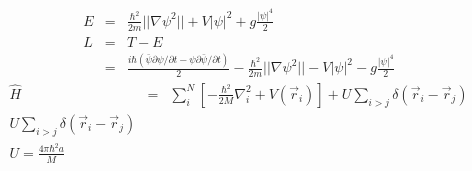 \documentclass[12pt,a4paper]{report} %
\begin{document}
\begin{eqnarray}
E & = & \frac{\hbar^2}{2m} ||\nabla \psi^2|| + V |\psi|^2 + g \frac{|\psi|^4}{2}
\\
L & = & T - E
\\
& = & \frac{i \hbar (\bar{\psi}\partial \psi/\partial t - \psi \partial \bar{\psi} / \partial t)}{2}
- \frac{\hbar^2}{2m} ||\nabla \psi^2|| - V |\psi|^2 - g \frac{|\psi|^4}{2}
\end{eqnarray}
\begin{eqnarray}
\hat{H} & = & \sum_i^N \left[ - \frac{\hbar^2}{2M} \nabla_i^2 + V (\vec{r}_i) \right] + U \sum_{i>j}
\delta(\vec{r}_i - \vec{r}_j)
\\
U \sum_{i>j} \delta(\vec{r}_i - \vec{r}_j)
\\
U = \frac{4 \pi \hbar^2 a}{M}
\end{eqnarray}
\fi
\end{document}
